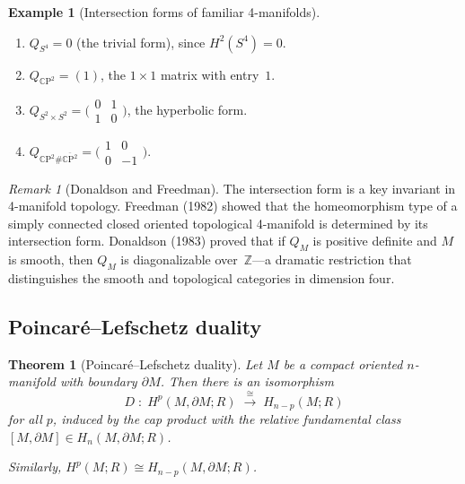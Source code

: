 \documentclass[12pt,a4paper,openany]{book}
\theoremstyle{definition}
\newtheorem{example}[definition]{Example}
\theoremstyle{plain}
\newtheorem{theorem}[definition]{Theorem}
\theoremstyle{remark}
\newtheorem{remark}[definition]{Remark}
\newcommand{\Z}{\mathbb{Z}}
\newcommand{\CP}{\mathbb{C}\mathrm{P}}
\begin{document}
\begin{example}[Intersection forms of familiar 4-manifolds]
\begin{enumerate}[label=(\roman*)]
  \item $Q_{S^4}=0$ (the trivial form), since $H^2(S^4)=0$.
  \item $Q_{\CP^2}=(1)$, the $1\times1$ matrix with entry~$1$.
  \item $Q_{S^2\times S^2}=\bigl(\begin{smallmatrix}0&1\\1&0
    \end{smallmatrix}\bigr)$, the hyperbolic form.
  \item $Q_{\CP^2\#\overline{\CP^2}}=
    \bigl(\begin{smallmatrix}1&0\\0&-1\end{smallmatrix}\bigr)$.
\end{enumerate}
\end{example}

\begin{remark}[Donaldson and Freedman]
The intersection form is a key invariant in 4-manifold topology.
Freedman (1982) showed that the homeomorphism type of a simply
connected closed oriented topological 4-manifold is determined by its
intersection form.  Donaldson (1983) proved that if $Q_M$ is positive
definite and $M$ is smooth, then $Q_M$ is diagonalizable
over~$\Z$---a dramatic restriction that distinguishes the smooth and
topological categories in dimension four.
\end{remark}

\subsection{Poincar\'e--Lefschetz duality}

\begin{theorem}[Poincar\'e--Lefschetz duality]
\label{thm:pl-duality}
Let $M$ be a compact oriented $n$-manifold with boundary
$\partial M$.  Then there is an
isomorphism
\[
  D\;:\; H^p(M,\partial M;R)
  \;\xrightarrow{\;\cong\;}\;
  H_{n-p}(M;R)
\]
for all $p$, induced by the cap product with the relative fundamental
class $[M,\partial M]\in H_n(M,\partial M;R)$.

Similarly, $H^p(M;R)\cong H_{n-p}(M,\partial M;R)$.
\end{theorem}
\end{document}
